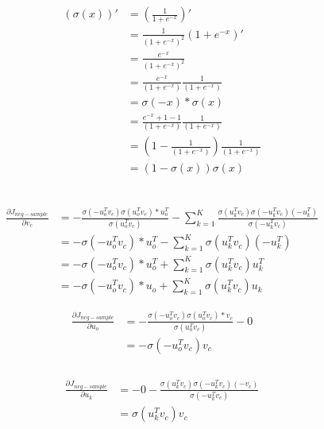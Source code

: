 \documentclass{article}
\begin{document}
\subsection{}
\begin{align*}
(\sigma(x))' &= (\frac{1}{1+e^{-x}})' \\
             &= \frac{1}{(1+e^{-x})^2}(1+e^{-x})'\\
             &= 
             \frac{e^{-x}}{(1+e^{-x})^2} \\
             &= \frac{e^{-x}}{(1+e^{-x})}\frac{1}{(1+e^{-x})} \\
             &= \sigma(-x)*\sigma(x) \\
             &= \frac{e^{-x}+1-1}{(1+e^{-x})}\frac{1}{(1+e^{-x})} \\
             &= (1 - \frac{1}{(1+e^{-x})}) \frac{1}{(1+e^{-x})} \\
             &= (1 - \sigma(x))\sigma(x) \\
\end{align*}

\subsection{}
\begin{align*}
 \frac{\partial J_{neg-sample}}{\partial v_c} 
 &= - \frac{\sigma(-u_o^Tv_c)\sigma(u_o^Tv_c)*u_o^T}{\sigma(u_o^Tv_c)}  - \sum_{k=1}^{K} \frac{ \sigma(u_k^Tv_c)\sigma(-u_k^Tv_c)(-u_k^T)}{\sigma(-u_k^Tv_c)} \\
 &= - \sigma(- u_o^Tv_c)*u_o^T  - \sum_{k=1}^{K} \sigma(u_k^Tv_c)(-u_k^T) \\
 &= - \sigma(- u_o^Tv_c)*u_o^T  + \sum_{k=1}^{K} \sigma(u_k^Tv_c) u_k^T \\
 &= - \sigma(- u_o^Tv_c)*u_o  + \sum_{k=1}^{K} \sigma(u_k^Tv_c) u_k
\end{align*}


\begin{align*}
 \frac{\partial J_{neg-sample}}{\partial u_o} 
 &= - \frac{\sigma(-u_o^Tv_c)\sigma(u_o^Tv_c)*v_c}{\sigma(u_o^Tv_c)}  - 0 \\
 &= - \sigma(-u_o^Tv_c)v_c  \\
\end{align*}
\\
\begin{align*}
 \frac{\partial J_{neg-sample}}{\partial u_k} 
 &= - 0 - \frac{ \sigma(u_k^Tv_c)\sigma(-u_k^Tv_c)(-v_c)}{\sigma(-u_k^Tv_c)}\\
 &=  \sigma(u_k^Tv_c)v_c
\end{align*}
\end{document}
